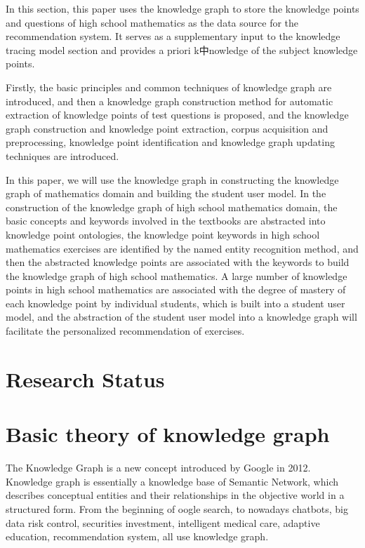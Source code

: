In this section, this paper uses the knowledge graph to store the knowledge points and questions of high school mathematics as the data source for the recommendation system. It serves as a supplementary input to the knowledge tracing model section and provides a priori k中nowledge of the subject knowledge points.

Firstly, the basic principles and common techniques of knowledge graph are introduced, and then a knowledge graph construction method for automatic extraction of knowledge points of test questions is proposed, and the knowledge graph construction and knowledge point extraction, corpus acquisition and preprocessing, knowledge point identification and knowledge graph updating techniques are introduced.

In this paper, we will use the knowledge graph in constructing the knowledge graph of mathematics domain and building the student user model. In the construction of the knowledge graph of high school mathematics domain, the basic concepts and keywords involved in the textbooks are abstracted into knowledge point ontologies, the knowledge point keywords in high school mathematics exercises are identified by the named entity recognition method, and then the abstracted knowledge points are associated with the keywords to build the knowledge graph of high school mathematics. A large number of knowledge points in high school mathematics are associated with the degree of mastery of each knowledge point by individual students, which is built into a student user model, and the abstraction of the student user model into a knowledge graph will facilitate the personalized recommendation of exercises.

\section{Research Status}


\section{Basic theory of knowledge graph}


The Knowledge Graph is a new concept introduced by Google in 2012. Knowledge graph is essentially a knowledge base of Semantic Network, which describes conceptual entities and their relationships in the objective world in a structured form. From the beginning of oogle search, to nowadays chatbots, big data risk control, securities investment, intelligent medical care, adaptive education, recommendation system, all use knowledge graph. 

